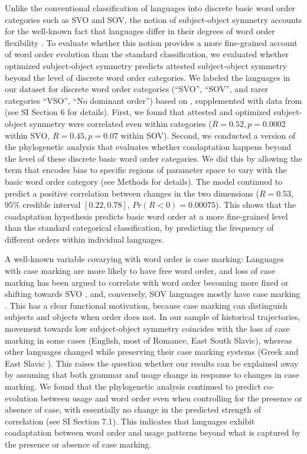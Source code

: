 \documentclass[11pt,a4paper]{article}
\begin{document}
Unlike the conventional classification of languages into discrete basic word order categories such as SVO and SOV, the notion of subject-object symmetry accounts for the well-known fact that languages differ in their degrees of word order flexibility \citep{steele1978word}.
To evaluate whether this notion provides a more fine-grained account of word order evolution than the standard classification, we evaluated whether optimized subject-object symmetry predicts attested subject-object symmetry beyond the level of discrete word order categories.
We labeled the languages in our dataset for discrete word order categories (``SVO'', ``SOV'', and rarer categories ``VSO'', ``No dominant order'') based on \citet{wals-81}, supplemented with data from \citet{gell-mann-origin-2011} (see SI Section 6 for details).
First, we found that attested and optimized subject-object symmetry were correlated even within categories ($R = 0.52, p = 0.0002$ within SVO, $R=0.45, p=0.07$ within SOV). 
Second, we conducted a version of the phylogenetic analysis that evaluates whether coadaptation happens beyond the level of these discrete basic word order categories.
We did this by allowing the term that encodes bias to specific regions of parameter space to vary with the basic word order category  (see Methods for details).
The model continued to predict a positive correlation between changes in the two dimensions ($R=0.53$, $95\%$ credible interval $[0.22, 0.78]$, $Pr(R < 0) = 0.00075$).
This shows that the coadaptation hypothesis predicts basic word order at a more fine-grained level than the standard categorical classification, by predicting the frequency of different orders within individual languages.


A well-known variable covarying with word order is case marking: Languages with case marking are more likely to have free word order, and loss of case marking has been argued to correlate with word order becoming more fixed or shifting towards SVO \citep{vennemann1974explanation}, and, conversely, SOV languages mostly have case marking \citep[Universal 41]{greenberg-universals-1963}.
This has a clear functional motivation, because case marking can distinguish subjects and objects when order does not.
In our sample of historical trajectories, movement towards low subject-object symmetry coincides with the loss of case marking in some cases (English, most of Romance, East South Slavic), whereas other languages changed while preserving their case marking systems (Greek \citep{taylor1994change} and East Slavic \citep[p. 242--4]{matthews1960russian}).
This raises the question whether our results can be explained away by assuming that both grammar and usage change in response to changes in case marking.
We found that the phylogenetic analysis continued to predict co-evolution between usage and word order even when controlling for the presence or absence of case, with essentially no change in the predicted strength of correlation (see SI Section 7.1).
This indicates that languages exhibit coadaptation between word order and usage patterns beyond what is captured by the presence or absence of case marking.
\end{document}
